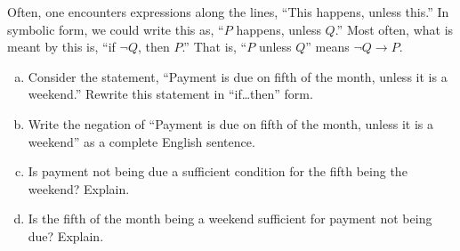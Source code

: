 \documentclass[11pt,letterpaper]{article}
\begin{document}

 Often, one encounters expressions along the lines, ``This happens, unless this.'' In symbolic form, we could write this as, ``$P$ happens, unless $Q$.'' Most often, what is meant by this is, ``if $\neg Q$, then $P$.'' That is, ``$P$ unless $Q$'' means $\neg Q \to P$. 
	\begin{enumerate}[(a)]
	\item Consider the statement, ``Payment is due on fifth of the month, unless it is a weekend.'' Rewrite this statement in ``if\dots then'' form.  
	\item Write the negation of ``Payment is due on fifth of the month, unless it is a weekend'' as a complete English sentence. 
	\item Is payment not being due a sufficient condition for the fifth being the weekend? Explain. 
	\item Is the fifth of the month being a weekend sufficient for payment not being due? Explain. 
	\end{enumerate} 
\end{document}
